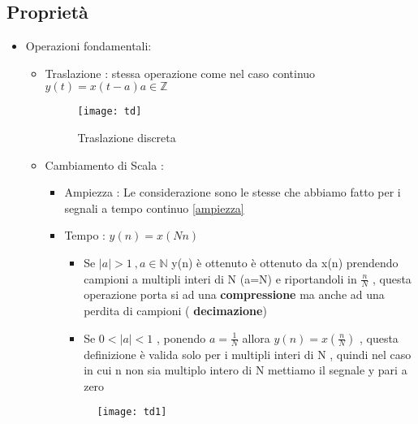 \documentclass{article}
\theoremstyle{definition}
\begin{document}
\subsection{Proprietà}
\begin{itemize}
	\item Operazioni fondamentali: \\ 
\begin{itemize}
	\item Traslazione : stessa operazione come nel caso continuo $y(t)=x(t-a) a \in \mathbb{Z}$
	\begin{figure}[h]
		\centering
		\texttt{[image: td]}
		\caption{Traslazione discreta}
		\label{fig:td}
	\end{figure}
	\item Cambiamento di Scala : 
	\begin{itemize}
		\item Ampiezza : Le considerazione sono le stesse che abbiamo fatto per i segnali a tempo continuo \ref{ampiezza}  
		\item Tempo : $y(n)=x(Nn)$
		\begin{itemize}
			\item Se $|a| >1 \ , a \in \mathbb{N}$   y(n) è ottenuto è ottenuto da x(n) prendendo  campioni a multipli interi  di N (a=N) e riportandoli in $\frac{n}{N}$ , questa operazione porta si ad una \textbf{compressione} ma anche ad una perdita di campioni ( \textbf{ decimazione})
			\item Se $0<|a|<1$ , ponendo $a=\frac{1}{N}$  allora $y(n)=x\left(\frac{n}{N}\right)$ , questa definizione è valida solo per i multipli interi di N , quindi nel caso in cui n non sia multiplo intero di N mettiamo il segnale  y pari a zero 
		\end{itemize} 
		\begin{figure}[h]
			\centering
			\texttt{[image: td1]}
		
			\label{fig:td1}
		\end{figure}
		
	\end{itemize}
	

\end{itemize}
\end{itemize}
\end{document}
